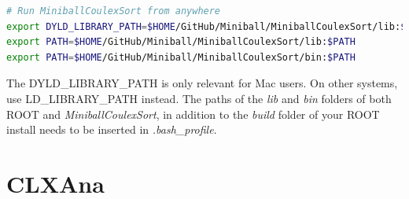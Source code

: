 \documentclass[twoside,english]{uiofysmaster/uiofysmaster}
\begin{document}
\begin{appendices}
\begin{lstlisting}[language=sh]
# Run MiniballCoulexSort from anywhere
export DYLD_LIBRARY_PATH=$HOME/GitHub/Miniball/MiniballCoulexSort/lib:$DYLD_LIBRARY_PATH
export PATH=$HOME/GitHub/Miniball/MiniballCoulexSort/lib:$PATH
export PATH=$HOME/GitHub/Miniball/MiniballCoulexSort/bin:$PATH
\end{lstlisting}
The DYLD\_LIBRARY\_PATH is only relevant for Mac users. 
On other systems, use LD\_LIBRARY\_PATH instead. 
The paths of the \textit{lib} and \textit{bin} folders of both ROOT and \textsl{MiniballCoulexSort}, in addition to the \textit{build} folder of your ROOT install needs to be inserted in \textit{.bash\_profile}.



\section{CLXAna}\label{sec:CLXAna}

\end{appendices}
\end{document}
